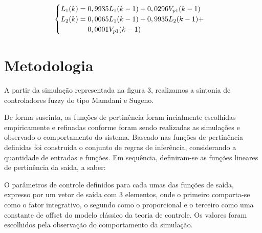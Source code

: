 \documentclass[conference]{IEEEtran}
\begin{document}
\begin{equation}
\label{eq:discrete}
\begin{cases}
L_{1}(k) = 0,9935 L_{1}(k-1) + 0,0296V_{p1}(k-1) \\
L_{2}(k) = 0,0065L_{1}(k-1)+0,9935L_{2}(k-1)+ \\ 
\hspace{1.33cm}0,0001V_{p1}(k-1)
\end{cases}
\end{equation}

\section{Metodologia}

A partir da simulação representada na figura 3, realizamos a sintonia de controladores fuzzy do tipo Mamdani e Sugeno.

De forma suscinta, as funções de pertinência foram incialmente escolhidas empiricamente e refinadas conforme foram sendo realizadas as simulações e observado o comportamento do sistema. Baseado nas funções de pertinência definidas foi construída o conjunto de regras de inferência, considerando a quantidade de entradas e funções. Em sequência, definiram-se as funções lineares de pertinência da saída, a saber:


O parâmetros de controle definidos para cada umas das funções de saída, expresso por um vetor de saída com 3 elementos, onde o primeiro comporta-se como o fator integrativo, o segundo como o proporcional e o terceiro como uma constante de offset do modelo clássico da teoria de controle. Os valores foram escolhidos pela observação do comportamento da simulação.
\end{document}
